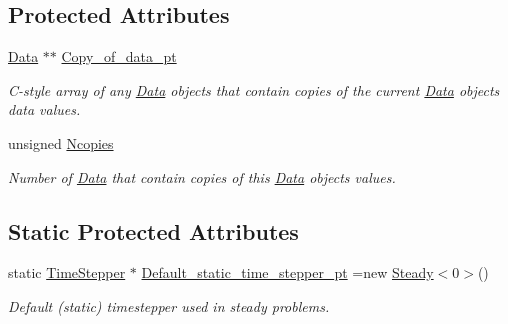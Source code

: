 \subsection*{Protected Attributes}
\begin{DoxyCompactItemize}
\item 
\hyperlink{classoomph_1_1Data}{Data} $\ast$$\ast$ \hyperlink{classoomph_1_1Data_a4e1e4a227baddb8f075761c48b06f4af}{Copy\+\_\+of\+\_\+data\+\_\+pt}
\begin{DoxyCompactList}\small\item\em C-\/style array of any \hyperlink{classoomph_1_1Data}{Data} objects that contain copies of the current \hyperlink{classoomph_1_1Data}{Data} object\textquotesingle{}s data values. \end{DoxyCompactList}\item 
unsigned \hyperlink{classoomph_1_1Data_a7e8dbdf96bf78658e85c1d7f81ff10dd}{Ncopies}
\begin{DoxyCompactList}\small\item\em Number of \hyperlink{classoomph_1_1Data}{Data} that contain copies of this \hyperlink{classoomph_1_1Data}{Data} object\textquotesingle{}s values. \end{DoxyCompactList}\end{DoxyCompactItemize}
\subsection*{Static Protected Attributes}
\begin{DoxyCompactItemize}
\item 
static \hyperlink{classoomph_1_1TimeStepper}{Time\+Stepper} $\ast$ \hyperlink{classoomph_1_1Data_a05936a16f5fca1612ad3f47b4e87d267}{Default\+\_\+static\+\_\+time\+\_\+stepper\+\_\+pt} =new \hyperlink{classoomph_1_1Steady}{Steady}$<$0$>$()
\begin{DoxyCompactList}\small\item\em Default (static) timestepper used in steady problems. \end{DoxyCompactList}\end{DoxyCompactItemize}
